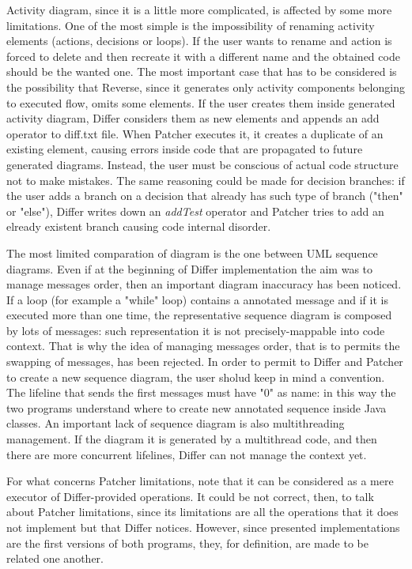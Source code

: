 Activity diagram, since it is a little more complicated, is affected by some more limitations.
One of the most simple is the impossibility of renaming activity elements (actions, decisions or loops). If the user wants to rename and action is forced to delete and then recreate it with a different name and the obtained code should be the wanted one.
The most important case that has to be considered is the possibility that Reverse, since it generates only activity components belonging to executed flow, omits some elements.
If the user creates them inside generated activity diagram, Differ considers them as new elements and appends an add operator to diff.txt file. When Patcher executes it, it creates a duplicate of an existing element, causing errors inside code that are propagated to future generated diagrams. Instead, the user must be conscious of actual code structure not to make mistakes.
The same reasoning could be made for decision branches: if the user adds a branch on a decision that already has such type of branch ("then" or "else"), Differ writes down an \textit{addTest} operator and Patcher tries to add an elready existent branch causing code internal disorder.

The most limited comparation of diagram is the one between UML sequence diagrams. Even if at the beginning of Differ implementation the aim was to manage messages order, then an important diagram inaccuracy has been noticed.
If a loop (for example a "while" loop) contains a annotated message and if it is executed more than one time, the representative sequence diagram is composed by lots of messages: such representation it is not precisely-mappable into code context. That is why the idea of managing messages order, that is to permits the swapping of messages, has been rejected.
In order to permit to Differ and Patcher to create a new sequence diagram, the user sholud keep in mind a convention. The lifeline that sends the first messages must have "0" as name: in this way the two programs understand where to create new annotated sequence inside Java classes.
An important lack of sequence diagram is also multithreading management. If the diagram it is generated by a multithread code, and then there are more concurrent lifelines, Differ can not manage the context yet.

For what concerns Patcher limitations, note that it can be considered as a mere executor of Differ-provided operations. It could be not correct, then, to talk about Patcher limitations, since its limitations are all the operations that it does not implement but that Differ notices. However, since presented implementations are the first versions of both programs, they, for definition, are made to be related one another.
